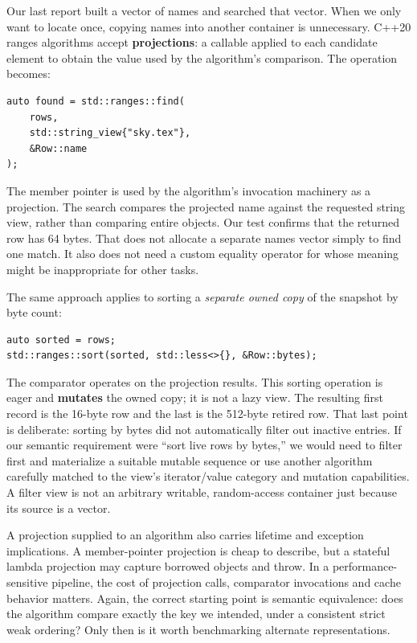 \hypertarget{05-engine-i-ch006-projections-are-not-the-same-thing-as-constructing-another-list-of-names}{}

Our last report built a vector of names and searched that vector. When we only want to locate  once, copying names into another container is unnecessary. C++20 ranges algorithms accept \textbf{projections}: a callable applied to each candidate element to obtain the value used by the algorithm's comparison. The operation becomes:

\begin{verbatim}
auto found = std::ranges::find(
    rows,
    std::string_view{"sky.tex"},
    &Row::name
);
\end{verbatim}

The member pointer  is used by the algorithm's invocation machinery as a projection. The search compares the projected name against the requested string view, rather than comparing entire  objects. Our test confirms that the returned row has 64 bytes. That does not allocate a separate names vector simply to find one match. It also does not need a custom equality operator for  whose meaning might be inappropriate for other tasks.

The same approach applies to sorting a \emph{separate owned copy} of the snapshot by byte count:

\begin{verbatim}
auto sorted = rows;
std::ranges::sort(sorted, std::less<>{}, &Row::bytes);
\end{verbatim}

The comparator operates on the projection results. This sorting operation is eager and \textbf{mutates} the owned copy; it is not a lazy view. The resulting first record is the 16-byte row and the last is the 512-byte retired row. That last point is deliberate: sorting by bytes did not automatically filter out inactive entries. If our semantic requirement were ``sort live rows by bytes,'' we would need to filter first and materialize a suitable mutable sequence or use another algorithm carefully matched to the view's iterator/value category and mutation capabilities. A filter view is not an arbitrary writable, random-access container just because its source is a vector.

A projection supplied to an algorithm also carries lifetime and exception implications. A member-pointer projection is cheap to describe, but a stateful lambda projection may capture borrowed objects and throw. In a performance-sensitive pipeline, the cost of projection calls, comparator invocations and cache behavior matters. Again, the correct starting point is semantic equivalence: does the algorithm compare exactly the key we intended, under a consistent strict weak ordering? Only then is it worth benchmarking alternate representations.

